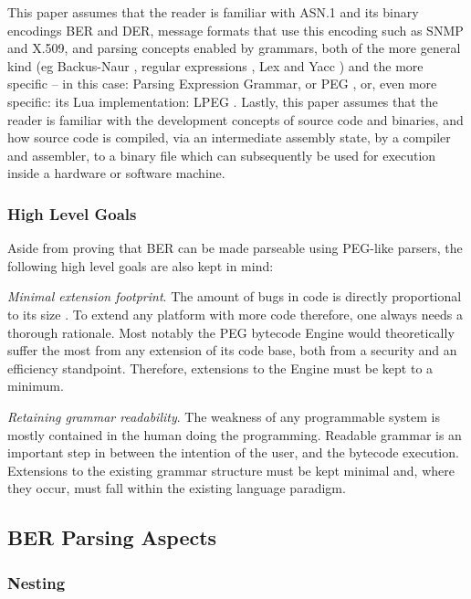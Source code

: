 This paper assumes that the reader is familiar with ASN.1 and its binary 
encodings BER and DER, message formats that use this encoding such as SNMP 
and X.509, and parsing concepts enabled by grammars, both of the more 
general kind (eg Backus-Naur \cite{bib:backusnaur},
regular expressions \cite{bib:regex}, Lex and Yacc \cite{bib:yacc}) and the 
more specific – in this case: Parsing Expression Grammar, or PEG
\cite{bib:peg}, or, 
even more specific: its Lua implementation: LPEG \cite{bib:lpeg}.
Lastly, this paper assumes that the reader is familiar with the development
concepts of source code and binaries, and
how source code is compiled, via an intermediate assembly state, by a compiler
and assembler, to a binary file
which can subsequently be used for execution
inside a hardware or software machine.

\subsubsection{High Level Goals}

Aside from proving that BER can be made parseable using PEG-like parsers, 
the following high level goals are also kept in mind:

\textit{Minimal extension footprint}. The amount of bugs in code is directly 
proportional to its size \cite{bib:bugs}.
To extend any platform with more code 
therefore, one always needs a thorough rationale. Most notably the PEG 
bytecode Engine would theoretically suffer the most from any extension of 
its code base, both from a security and an efficiency standpoint. 
Therefore, extensions to the Engine must be kept to a minimum.

\textit{Retaining grammar readability}.
The weakness of any programmable system is 
mostly contained in the human doing the programming. Readable grammar is 
an important step in between the intention of the user, and the bytecode 
execution. Extensions to the existing grammar structure must be kept 
minimal and, where they occur, must fall within the existing language 
paradigm.

\subsection{BER Parsing Aspects}

\subsubsection{Nesting}

